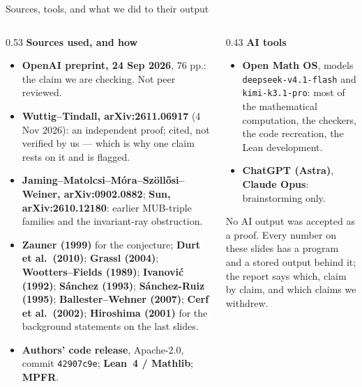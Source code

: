 \documentclass[aspectratio=169,10pt]{beamer}
\begin{document}
\begin{frame}{Sources, tools, and what we did to their output}
  \scriptsize
  \begin{columns}[T]
  \begin{column}{0.53\textwidth}
    \textbf{Sources used, and how}\\[1mm]
    \begin{itemize}\setlength{\itemsep}{1pt}
      \item \textbf{OpenAI preprint, 24 Sep 2026}, 76 pp.: the claim we are checking.
            Not peer reviewed.
      \item \textbf{Wuttig--Tindall, arXiv:2611.06917} (4 Nov 2026): an independent proof;
            cited, not verified by us --- which is why one claim rests on it and is flagged.
      \item \textbf{Jaming--Matolcsi--M\'ora--Sz\"oll\H{o}si--Weiner, arXiv:0902.0882};
            \textbf{Sun, arXiv:2610.12180}: earlier MUB-triple families and the invariant-ray
            obstruction.
      \item \textbf{Zauner (1999)} for the conjecture; \textbf{Durt et al.\ (2010)};
            \textbf{Grassl (2004)}; \textbf{Wootters--Fields (1989)};
            \textbf{Ivanovi\'c (1992)}; \textbf{S\'anchez (1993)}; \textbf{S\'anchez-Ruiz (1995)};
            \textbf{Ballester--Wehner (2007)}; \textbf{Cerf et al.\ (2002)};
            \textbf{Hiroshima (2001)} for the background statements on the last slides.
      \item \textbf{Authors' code release}, Apache-2.0, commit \texttt{42907c9e};
            \textbf{Lean~4 / Mathlib}; \textbf{MPFR}.
    \end{itemize}
  \end{column}
  \begin{column}{0.43\textwidth}
    \textbf{AI tools}\\[1mm]
    \begin{itemize}\setlength{\itemsep}{1pt}
      \item \textbf{Open Math OS}, models \texttt{deepseek-v4.1-flash} and
            \texttt{kimi-k3.1-pro}: most of the mathematical computation, the checkers,
            the code recreation, the Lean development.
      \item \textbf{ChatGPT (Astra)}, \textbf{Claude Opus}: brainstorming only.
    \end{itemize}
    \medskip
    {\color{ink!70}No AI output was accepted as a proof. Every number on these slides has a
    program and a stored output behind it; the report says which, claim by claim, and which
    claims we withdrew.}
  \end{column}
  \end{columns}
\end{frame}
\end{document}
